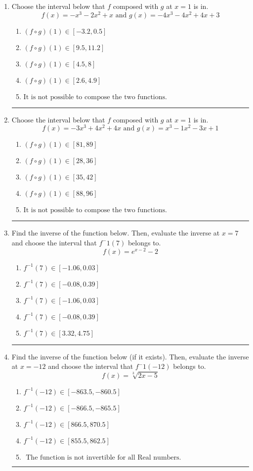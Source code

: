 \documentclass[14pt]{extbook}
\newcommand{\litem}[1]{\item#1\hspace*{-1cm}\rule{\textwidth}{0.4pt}}
\begin{document}
\begin{enumerate}
{\begin{enumerate}[label=\Alph*.]
\end{enumerate} }
\litem{
Choose the interval below that $f$ composed with $g$ at $x=1$ is in.\[ f(x) = -x^{3} -2 x^{2} +x \text{ and } g(x) = -4x^{3} -4 x^{2} +4 x + 3 \]\begin{enumerate}[label=\Alph*.]
\item \( (f \circ g)(1) \in [-3.2, 0.5] \)
\item \( (f \circ g)(1) \in [9.5, 11.2] \)
\item \( (f \circ g)(1) \in [4.5, 8] \)
\item \( (f \circ g)(1) \in [2.6, 4.9] \)
\item \( \text{It is not possible to compose the two functions.} \)

\end{enumerate} }
\litem{
Choose the interval below that $f$ composed with $g$ at $x=1$ is in.\[ f(x) = -3x^{3} +4 x^{2} +4 x \text{ and } g(x) = x^{3} -1 x^{2} -3 x + 1 \]\begin{enumerate}[label=\Alph*.]
\item \( (f \circ g)(1) \in [81, 89] \)
\item \( (f \circ g)(1) \in [28, 36] \)
\item \( (f \circ g)(1) \in [35, 42] \)
\item \( (f \circ g)(1) \in [88, 96] \)
\item \( \text{It is not possible to compose the two functions.} \)

\end{enumerate} }
\litem{
Find the inverse of the function below. Then, evaluate the inverse at $x = 7$ and choose the interval that $f^-1(7)$ belongs to.\[ f(x) = e^{x-2}-2 \]\begin{enumerate}[label=\Alph*.]
\item \( f^{-1}(7) \in [-1.06, 0.03] \)
\item \( f^{-1}(7) \in [-0.08, 0.39] \)
\item \( f^{-1}(7) \in [-1.06, 0.03] \)
\item \( f^{-1}(7) \in [-0.08, 0.39] \)
\item \( f^{-1}(7) \in [3.32, 4.75] \)

\end{enumerate} }
\litem{
Find the inverse of the function below (if it exists). Then, evaluate the inverse at $x = -12$ and choose the interval that $f^-1(-12)$ belongs to.\[ f(x) = \sqrt[3]{2 x - 5} \]\begin{enumerate}[label=\Alph*.]
\item \( f^{-1}(-12) \in [-863.5, -860.5] \)
\item \( f^{-1}(-12) \in [-866.5, -865.5] \)
\item \( f^{-1}(-12) \in [866.5, 870.5] \)
\item \( f^{-1}(-12) \in [855.5, 862.5] \)
\item \( \text{ The function is not invertible for all Real numbers. } \)


\end{enumerate}}
\end{enumerate}
\end{document}
